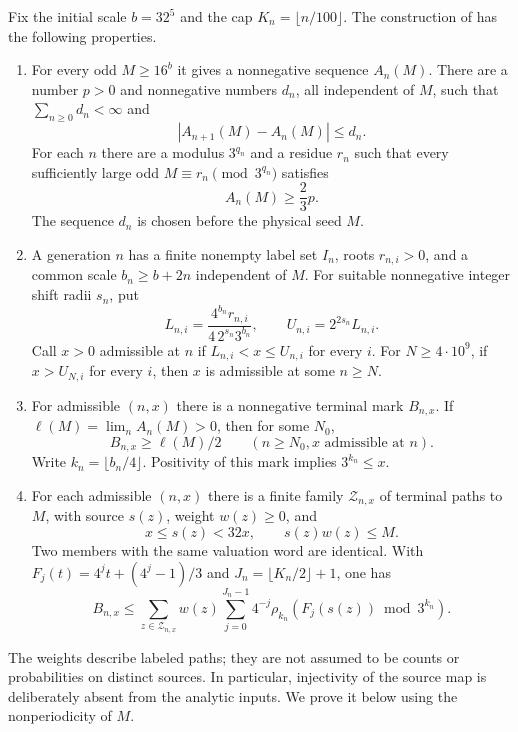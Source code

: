 \begin{theorem}\label{thm:input}
Fix the initial scale $b=32^5$ and the cap $K_n=\lfloor n/100\rfloor$.
The construction of \cite{mazur-density} has the following properties.
\begin{enumerate}
\item For every odd $M\ge16^b$ it gives a nonnegative sequence $A_n(M)$.
There are a number $p>0$ and nonnegative numbers $d_n$, all independent
of $M$, such that $\sum_{n\ge0}d_n<\infty$ and
\begin{equation}\label{eq:increments}
 |A_{n+1}(M)-A_n(M)|\le d_n.
\end{equation}
For each $n$ there are a modulus $3^{q_n}$ and a residue $r_n$ such that
every sufficiently large odd $M\equiv r_n\pmod{3^{q_n}}$ satisfies
\begin{equation}\label{eq:activate}
 A_n(M)\ge\frac23p.
\end{equation}
The sequence $d_n$ is chosen before the physical seed $M$.
\item A generation $n$ has a finite nonempty label set $I_n$, roots
$r_{n,i}>0$, and a common scale $b_n\ge b+2n$ independent of $M$.
For suitable nonnegative integer shift radii $s_n$, put
\[
 L_{n,i}=\frac{4^{b_n}r_{n,i}}{4\,2^{s_n}3^{b_n}},\qquad
 U_{n,i}=2^{2s_n}L_{n,i}.
\]
Call $x>0$ admissible at $n$ if $L_{n,i}<x\le U_{n,i}$ for every $i$.
For $N\ge4\cdot10^9$, if $x>U_{N,i}$ for every $i$, then $x$ is
admissible at some $n\ge N$.
\item For admissible $(n,x)$ there is a nonnegative terminal mark $B_{n,x}$.
If $\ell(M)=\lim_n A_n(M)>0$, then for some $N_0$,
\begin{equation}\label{eq:mark}
 B_{n,x}\ge\ell(M)/2\qquad(n\ge N_0, x\text{ admissible at }n).
\end{equation}
Write $k_n=\lfloor b_n/4\rfloor$. Positivity of this mark implies
$3^{k_n}\le x$.
\item For each admissible $(n,x)$ there is a finite family $\mathcal Z_{n,x}$
of terminal paths to $M$, with source $s(z)$, weight $w(z)\ge0$, and
\begin{equation}\label{eq:budget}
 x\le s(z)<32x,\qquad s(z)w(z)\le M.
\end{equation}
Two members with the same valuation word are identical. With
$F_j(t)=4^jt+(4^j-1)/3$ and $J_n=\lfloor K_n/2\rfloor+1$, one has
\begin{equation}\label{eq:faninput}
 B_{n,x}\le\sum_{z\in\mathcal Z_{n,x}}w(z)
       \sum_{j=0}^{J_n-1}4^{-j}\rho_{k_n}(F_j(s(z))\bmod3^{k_n}).
\end{equation}
\end{enumerate}
\end{theorem}
The weights describe labeled paths; they are not assumed to be counts or
probabilities on distinct sources. In particular, injectivity of the source
map is deliberately absent from the analytic inputs. We prove it below
using the nonperiodicity of $M$.

